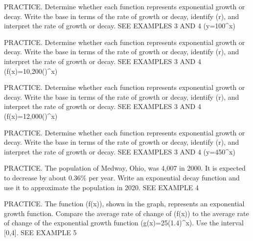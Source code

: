 \documentclass{article}
\newenvironment{practice}[2]{}{}        %
\newcommand{\answer}[1]{}               %
\newcommand{\placeholder}[2]{}          %
\begin{document}
\begin{practice}{21}{2}
PRACTICE. Determine whether each function represents exponential growth or decay. Write the base in terms of the rate of growth or decay, identify (r), and interpret the rate of growth or decay. SEE EXAMPLES 3 AND 4
(y=100^x)
\answer{growth; (1+1.5); 1.5; 150\%}
\end{practice}
\begin{practice}{22}{2}
PRACTICE. Determine whether each function represents exponential growth or decay. Write the base in terms of the rate of growth or decay, identify (r), and interpret the rate of growth or decay. SEE EXAMPLES 3 AND 4
(f(x)=10,200()^x)
\answer{decay; (1-\frac25); (\frac25); 40\%}
\end{practice}
\begin{practice}{23}{2}
PRACTICE. Determine whether each function represents exponential growth or decay. Write the base in terms of the rate of growth or decay, identify (r), and interpret the rate of growth or decay. SEE EXAMPLES 3 AND 4
(f(x)=12,000()^x)
\answer{decay; (1-\frac3{10}); (\frac3{10}); 30\%}
\end{practice}
\begin{practice}{24}{2}
PRACTICE. Determine whether each function represents exponential growth or decay. Write the base in terms of the rate of growth or decay, identify (r), and interpret the rate of growth or decay. SEE EXAMPLES 3 AND 4
(y=450^x)
\answer{growth; (1+1); 1; 100\%}
\end{practice}
\begin{practice}{25}{2}
PRACTICE. The population of Medway, Ohio, was 4,007 in 2000. It is expected to decrease by about 0.36\% per year. Write an exponential decay function and use it to approximate the population in 2020. SEE EXAMPLE 4
\answer{(f(x)=4,007(0.9964)^x); 3,728}
\end{practice}
\begin{practice}{26}{3}
PRACTICE. The function (f(x)), shown in the graph, represents an exponential growth function. Compare the average rate of change of (f(x)) to the average rate of change of the exponential growth function (g(x)=25(1.4)^x). Use the interval [0,4]. SEE EXAMPLE 5
\placeholder{graph}{Blue increasing curve with marked/labeled (0,30), (3,58.6), (4,73.2); arrow at upper right near (5.5,100). Horizontal axis x from 0 to 7, grid step 1, labels 0,2,4,6; vertical f(x) from 0 to 100, grid step 10, labels 0,20,40,60,80,100. Positive axis arrows.}
\answer{The average rate of change of (g(x)), 17.8, is greater than the average rate of change of (f(x)), 10.8.}
\end{practice}
\end{document}
